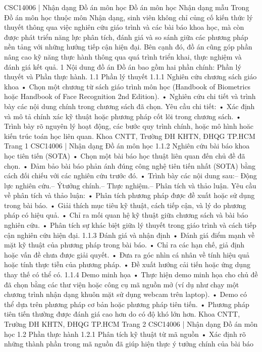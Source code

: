 CSC14006 | Nhận dạng
Đồ án môn học
Đồ án môn học
Nhận dạng mẫu
Trong Đồ án môn học thuộc môn Nhận dạng, sinh viên không chỉ củng cố kiến thức lý thuyết
thông qua việc nghiên cứu giáo trình và các bài báo khoa học, mà còn được phát triển năng lực
phân tích, đánh giá và so sánh giữa các phương pháp nền tảng với những hướng tiếp cận hiện đại.
Bên cạnh đó, đồ án cũng góp phần nâng cao kỹ năng thực hành thông qua quá trình triển khai,
thực nghiệm và đánh giá kết quả.
1 Nội dung đồ án
Đồ án bao gồm hai phần chính: Phần lý thuyết và Phần thực hành.
1.1 Phần lý thuyết
1.1.1 Nghiên cứu chương sách giáo khoa
• Chọn một chương từ sách giáo trình môn học (Handbook of Biometrics hoặc Handbook of
Face Recognition 2nd Edition).
• Nghiên cứu chi tiết và trình bày các nội dung chính trong chương sách đã chọn.
Yêu cầu chi tiết:
• Xác định và mô tả chính xác kỹ thuật hoặc phương pháp cốt lõi trong chương sách.
• Trình bày rõ nguyên lý hoạt động, các bước quy trình chính, hoặc mô hình hoăc kiến trúc
toán học liên quan.
Khoa CNTT, Trường ĐH KHTN, ĐHQG TP.HCM
Trang 1
CSC14006 | Nhận dạng
Đồ án môn học
1.1.2 Nghiên cứu bài báo khoa học tiên tiến (SOTA)
• Chọn một bài báo học thuật liên quan đến chủ đề đã chọn.
• Đảm bảo bài báo phản ánh đúng công nghệ tiên tiến nhất (SOTA) bằng cách đối chiếu với
các nghiên cứu trước đó.
• Trình bày các nội dung sau:– Động lực nghiên cứu.– Ýtưởng chính.– Thực nghiệm.– Phân tích và thảo luận.
Yêu cầu về phân tích và thảo luận:
• Phân tích phương pháp được đề xuất hoặc sử dụng trong bài báo.
• Giải thích mục tiêu kỹ thuật, cách tiếp cận, và lý do phương pháp có hiệu quả.
• Chỉ ra mối quan hệ kỹ thuật giữa chương sách và bài báo nghiên cứu.
• Phân tích sự khác biệt giữa lý thuyết trong giáo trình và cách tiếp cận nghiên cứu hiện đại.
1.1.3 Đánh giá và nhận định
• Đánh giá điểm mạnh về mặt kỹ thuật của phương pháp trong bài báo.
• Chỉ ra các hạn chế, giả định hoặc vấn đề chưa được giải quyết.
• Đưa ra góc nhìn cá nhân về tính hiệu quả hoặc tính thực tiễn của phương pháp.
• Đề xuất hướng cải tiến hoặc ứng dụng thay thế có thể có.
1.1.4 Demo minh họa
• Thực hiện demo minh họa cho chủ đề đã chọn bằng các thư viện hoặc công cụ mã nguồn mở
(ví dụ như chạy một chương trình nhận dạng khuôn mặt sử dụng webcam trên laptop).
• Demo có thể dựa trên phương pháp cơ bản hoặc phương pháp tiên tiến.
• Phương pháp tiên tiến thường được đánh giá cao hơn do có độ khó lớn hơn.
Khoa CNTT, Trường ĐH KHTN, ĐHQG TP.HCM
Trang 2
CSC14006 | Nhận dạng
Đồ án môn học
1.2 Phần thực hành
1.2.1 Phân tích kỹ thuật từ mã nguồn
• Xác định rõ những thành phần trong mã nguồn đã giúp hiện thực ý tưởng chính của bài báo

